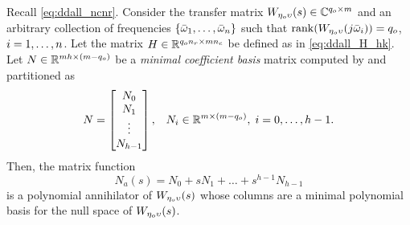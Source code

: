 \begin{proposition}
  \label{prop:ddall_annih_computation}
  Recall \eqref{eq:ddall_ncnr}. Consider the transfer matrix $W_{\eta_o\upsilon}(s)\in\mathbb{C}^{{q_o}\times m}$ and an arbitrary collection of frequencies $\{\bar{\omega}_1,\dotsc,\bar{\omega}_n\}$ such that $\operatorname{rank}(W_{\eta_o\upsilon}(j\bar{\omega}_i))={q_o}$, $i=1,\dotsc,n$. Let the matrix $H\in\mathbb{R}^{{q_o} n_r \times m n_c}$ be defined as in \eqref{eq:ddall_H_hk}. Let $N\in\mathbb{R}^{m h\times(m - {q_o})}$ be a \emph{minimal coefficient basis} matrix computed by  and partitioned as
  \begin{align}
    N &= \begin{bmatrix}N_0 \\ N_1 \\ \vdots \\ N_{h-1}\end{bmatrix}, & N_i\in\mathbb{R}^{m\times(m - {q_o})}, \; i=0,\dotsc,h-1.
  \end{align}
  Then, the matrix function
  \begin{equation}
    \label{eq:ddall_Na}
    N_a(s) = N_0 + sN_1 + \ldots + s^{h-1}N_{h-1}
  \end{equation}
  is a polynomial annihilator of $W_{\eta_o\upsilon}(s)$ whose columns are a minimal polynomial basis for the null space of $W_{\eta_o\upsilon}(s)$.\closestatement
\end{proposition}
